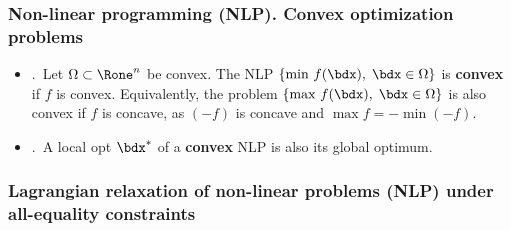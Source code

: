 \documentclass[a4paper]{article}
\begin{document}
\subsubsection*{Non-linear programming (NLP). Convex optimization problems}%

\begin{itemize}

  \item \Def.~Let $\Omega\subset\Rone^n$ be convex.
    The NLP
    $\{\text{min}~f(\bdx), \; \bdx\in\Omega\}$
    is \textbf{convex} if $f$ is convex.
    Equivalently,
    the problem
    $\{\text{max}~f(\bdx), \; \bdx\in\Omega\}$
    is also convex if $f$ is concave,
    as $(-f)$ is concave and $\max f = -\min(-f)$.

  \item \Thm.~A local opt $\bdx^*$ of a \textbf{convex} NLP
    is also its global optimum. %
\end{itemize}%

\subsubsection*{Lagrangian relaxation of non-linear problems (NLP) under all-equality constraints}%
\end{document}
